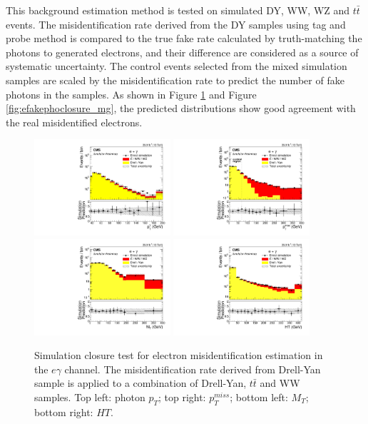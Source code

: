 \documentclass[thesis.tex]{subfiles}
\renewcommand\_{\textunderscore\allowbreak}
\begin{document}
   This background estimation method is tested on simulated DY, WW, WZ and $t\bar{t}$ events. The misidentification rate derived from the DY samples using tag and probe method is compared to the true fake rate calculated by truth-matching the photons to generated electrons, and their difference are considered as a source of systematic uncertainty. The control events selected from the mixed simulation samples are scaled by the misidentification rate to predict the number of fake photons in the samples. As shown in Figure \ref{fig:efakephoclosure_egamma} and Figure \ref{fig:efakephoclosure_mg}, the predicted distributions show good agreement with the real misidentified electrons.  

\begin{figure}[hbtp]
  \centering
    \includegraphics[width=0.45\textwidth]{Fig/closure_elefakepho_PhotonEt_eg.pdf}
    \includegraphics[width=0.45\textwidth]{Fig/closure_elefakepho_MET_eg.pdf}
    \includegraphics[width=0.45\textwidth]{Fig/closure_elefakepho_MT_eg.pdf}
    \includegraphics[width=0.45\textwidth]{Fig/closure_elefakepho_HT_eg.pdf}
  \caption{Simulation closure test for electron misidentification estimation in the $e\gamma$ channel. The misidentification rate derived from Drell-Yan sample is applied to a combination of Drell-Yan, $t\bar{t}$ and WW samples. Top left: photon $p_T$; top right: $p_T^{miss}$; bottom left: $M_T$; bottom right: $HT$.}
  \label{fig:efakephoclosure_egamma}
\end{figure}
\end{document}
